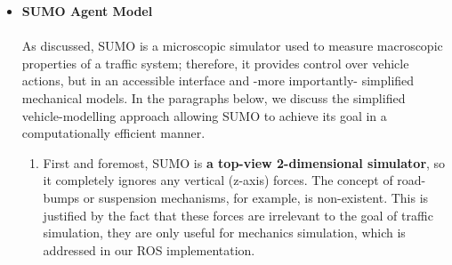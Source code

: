 \begin{itemize}
\begin{enumerate}
    \item \textbf{Simulation} 
    \\ \\The application “sumo” launches a simulation of a previously configured network, our 3-lane network in this case. The simulation time is discretized, with a default simulation step size of 1 second. During simulation, vehicles navigate through the network according to the route specified by their type.
    \\We used the application “sumo” to perform a series of simulation epochs in our RL algorithm to allow agents a near realistic experience with the environment. Hence, rewards and Q table updates are iteratively performed after every epoch.\\
    
    \item \textbf{On-Line Interaction} 
    \\ \\SUMO  provides the ability to interact with an external application via a socket connection. This is done through the python interface TraCI: “Traffic Control Interface”, which facilitates controlling and retrieving vehicles states such as: speed, lane, position, as well as communicating this information between the vehicles. We also made use of TraCI in checking action feasibility. For instance: checking whether an agent is able to change lane (left/right) or accelerate.\\
    
\end{enumerate}

\item \textbf{SUMO Agent Model}
\label{sumo_agent_model}
\\ \\As discussed, SUMO is a microscopic simulator used to measure macroscopic properties of a traffic system; therefore, it provides control over vehicle actions, but in an accessible interface and -more importantly- simplified mechanical models. In the paragraphs below, we discuss the simplified vehicle-modelling approach allowing SUMO to achieve its goal in a computationally efficient manner.
\begin{enumerate}
    \item First and foremost, SUMO is \textbf{a top-view 2-dimensional simulator}, so it completely ignores any vertical (z-axis) forces. The concept of road-bumps or suspension mechanisms, for example, is non-existent. This is justified by the fact that these forces are irrelevant to the goal of traffic simulation, they are only useful for mechanics simulation, which is addressed in our ROS implementation.
    

\end{enumerate}
\end{itemize}

